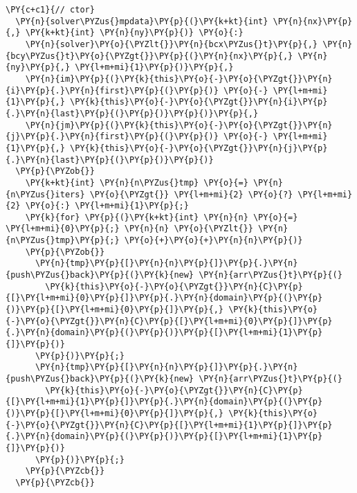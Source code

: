 \begin{Verbatim}[commandchars=\\\{\}]
  \PY{c+c1}{// ctor}
  \PY{n}{solver\PYZus{}mpdata}\PY{p}{(}\PY{k+kt}{int} \PY{n}{nx}\PY{p}{,} \PY{k+kt}{int} \PY{n}{ny}\PY{p}{)} \PY{o}{:} 
    \PY{n}{solver}\PY{o}{\PYZlt{}}\PY{n}{bcx\PYZus{}t}\PY{p}{,} \PY{n}{bcy\PYZus{}t}\PY{o}{\PYZgt{}}\PY{p}{(}\PY{n}{nx}\PY{p}{,} \PY{n}{ny}\PY{p}{,} \PY{l+m+mi}{1}\PY{p}{)}\PY{p}{,} 
    \PY{n}{im}\PY{p}{(}\PY{k}{this}\PY{o}{-}\PY{o}{\PYZgt{}}\PY{n}{i}\PY{p}{.}\PY{n}{first}\PY{p}{(}\PY{p}{)} \PY{o}{-} \PY{l+m+mi}{1}\PY{p}{,} \PY{k}{this}\PY{o}{-}\PY{o}{\PYZgt{}}\PY{n}{i}\PY{p}{.}\PY{n}{last}\PY{p}{(}\PY{p}{)}\PY{p}{)}\PY{p}{,}
    \PY{n}{jm}\PY{p}{(}\PY{k}{this}\PY{o}{-}\PY{o}{\PYZgt{}}\PY{n}{j}\PY{p}{.}\PY{n}{first}\PY{p}{(}\PY{p}{)} \PY{o}{-} \PY{l+m+mi}{1}\PY{p}{,} \PY{k}{this}\PY{o}{-}\PY{o}{\PYZgt{}}\PY{n}{j}\PY{p}{.}\PY{n}{last}\PY{p}{(}\PY{p}{)}\PY{p}{)}
  \PY{p}{\PYZob{}}
    \PY{k+kt}{int} \PY{n}{n\PYZus{}tmp} \PY{o}{=} \PY{n}{n\PYZus{}iters} \PY{o}{\PYZgt{}} \PY{l+m+mi}{2} \PY{o}{?} \PY{l+m+mi}{2} \PY{o}{:} \PY{l+m+mi}{1}\PY{p}{;}
    \PY{k}{for} \PY{p}{(}\PY{k+kt}{int} \PY{n}{n} \PY{o}{=} \PY{l+m+mi}{0}\PY{p}{;} \PY{n}{n} \PY{o}{\PYZlt{}} \PY{n}{n\PYZus{}tmp}\PY{p}{;} \PY{o}{+}\PY{o}{+}\PY{n}{n}\PY{p}{)}
    \PY{p}{\PYZob{}}
      \PY{n}{tmp}\PY{p}{[}\PY{n}{n}\PY{p}{]}\PY{p}{.}\PY{n}{push\PYZus{}back}\PY{p}{(}\PY{k}{new} \PY{n}{arr\PYZus{}t}\PY{p}{(}
        \PY{k}{this}\PY{o}{-}\PY{o}{\PYZgt{}}\PY{n}{C}\PY{p}{[}\PY{l+m+mi}{0}\PY{p}{]}\PY{p}{.}\PY{n}{domain}\PY{p}{(}\PY{p}{)}\PY{p}{[}\PY{l+m+mi}{0}\PY{p}{]}\PY{p}{,} \PY{k}{this}\PY{o}{-}\PY{o}{\PYZgt{}}\PY{n}{C}\PY{p}{[}\PY{l+m+mi}{0}\PY{p}{]}\PY{p}{.}\PY{n}{domain}\PY{p}{(}\PY{p}{)}\PY{p}{[}\PY{l+m+mi}{1}\PY{p}{]}\PY{p}{)}
      \PY{p}{)}\PY{p}{;}
      \PY{n}{tmp}\PY{p}{[}\PY{n}{n}\PY{p}{]}\PY{p}{.}\PY{n}{push\PYZus{}back}\PY{p}{(}\PY{k}{new} \PY{n}{arr\PYZus{}t}\PY{p}{(}
        \PY{k}{this}\PY{o}{-}\PY{o}{\PYZgt{}}\PY{n}{C}\PY{p}{[}\PY{l+m+mi}{1}\PY{p}{]}\PY{p}{.}\PY{n}{domain}\PY{p}{(}\PY{p}{)}\PY{p}{[}\PY{l+m+mi}{0}\PY{p}{]}\PY{p}{,} \PY{k}{this}\PY{o}{-}\PY{o}{\PYZgt{}}\PY{n}{C}\PY{p}{[}\PY{l+m+mi}{1}\PY{p}{]}\PY{p}{.}\PY{n}{domain}\PY{p}{(}\PY{p}{)}\PY{p}{[}\PY{l+m+mi}{1}\PY{p}{]}\PY{p}{)}
      \PY{p}{)}\PY{p}{;}
    \PY{p}{\PYZcb{}}
  \PY{p}{\PYZcb{}}


\end{Verbatim}
